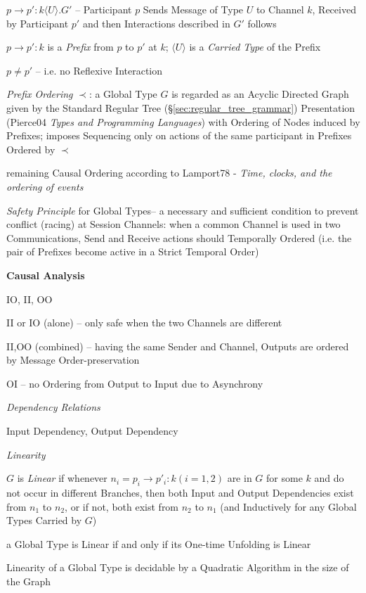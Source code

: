 $p \rightarrow p' : k \langle U \rangle.G'$ -- Participant $p$ Sends
Message of Type $U$ to Channel $k$, Received by Participant $p'$ and
then Interactions described in $G'$ follows

$p \rightarrow p' : k$ is a \emph{Prefix} from $p$ to $p'$ at $k$;
$\langle U \rangle$ is a \emph{Carried Type} of the Prefix

$p \neq p'$ -- i.e. no Reflexive Interaction

\emph{Prefix Ordering} $\prec$: a Global Type $G$ is regarded as an
Acyclic Directed Graph given by the Standard Regular Tree
(\S\ref{sec:regular_tree_grammar}) Presentation (Pierce04 \emph{Types
  and Programming Languages}) with Ordering of Nodes induced by
Prefixes; imposes Sequencing only on actions of the same participant
in Prefixes Ordered by $\prec$

remaining Causal Ordering according to Lamport78 - \emph{Time, clocks,
  and the ordering of events}


\emph{Safety Principle} for Global Types-- a necessary and sufficient
condition to prevent conflict (racing) at Session Channels: when a
common Channel is used in two Communications, Send and Receive actions
should Temporally Ordered (i.e. the pair of Prefixes become active in
a Strict Temporal Order)


\textbf{Causal Analysis}

IO, II, OO

II or IO (alone) -- only safe when the two Channels are different

II,OO (combined) -- having the same Sender and Channel, Outputs are
ordered by Message Order-preservation

OI -- no Ordering from Output to Input due to Asynchrony

\emph{Dependency Relations}

Input Dependency, Output Dependency

\emph{Linearity}

$G$ is \emph{Linear} if whenever $n_i = p_i \rightarrow p'_i : k (i =
1,2)$ are in $G$ for some $k$ and do not occur in different Branches,
then both Input and Output Dependencies exist from $n_1$ to $n_2$, or
if not, both exist from $n_2$ to $n_1$ (and Inductively for any Global
Types Carried by $G$)

a Global Type is Linear if and only if its One-time Unfolding is Linear

Linearity of a Global Type is decidable by a Quadratic Algorithm in
the size of the Graph

